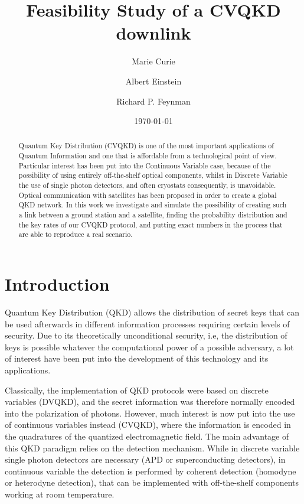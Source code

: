 \documentclass[%
 reprint,
 amsmath,amssymb,
 aps,
]{revtex4-1}
\begin{document}
\title{Feasibility Study of a CVQKD downlink}%

\author{Marie Curie}
\author{Albert Einstein}%
\author{Richard P. Feynman}

\date{\today}%

\begin{abstract}
Quantum Key Distribution (CVQKD) is one of the most important applications of Quantum Information and one that is affordable from a technological point of view. Particular interest has been put into the Continuous Variable case, because of the possibility of using entirely off-the-shelf optical components, whilst in Discrete Variable the use of single photon detectors, and often cryostats consequently, is unavoidable. Optical communication with satellites has been proposed in order to create a global QKD network. In this work we investigate and simulate the possibility of creating such a link between a ground station and a satellite, finding the probability distribution and the key rates of our CVQKD protocol, and putting exact numbers in the process that are able to reproduce a real scenario.
\end{abstract}
\maketitle

\section{Introduction}
Quantum Key Distribution (QKD) allows the distribution of secret keys that can be used afterwards in different information processes requiring certain levels of security. Due to its theoretically unconditional security, i.e, the distribution of keys is possible whatever the computational power of a possible adversary, a lot of interest have been put into the development of this technology and its applications. 

Classically, the implementation of QKD protocols were based on discrete variables (DVQKD), and the secret information was therefore normally encoded into the polarization of photons. However, much interest is now put into the use of continuous variables instead (CVQKD), where the information is encoded in the quadratures of the quantized electromagnetic field. The main advantage of this QKD paradigm relies on the detection mechanism. While in discrete variable single photon detectors are necessary (APD or superconducting detectors), in continuous variable the detection is performed by coherent detection (homodyne or heterodyne detection), that can be implemented with off-the-shelf components working at room temperature.
\end{document}
